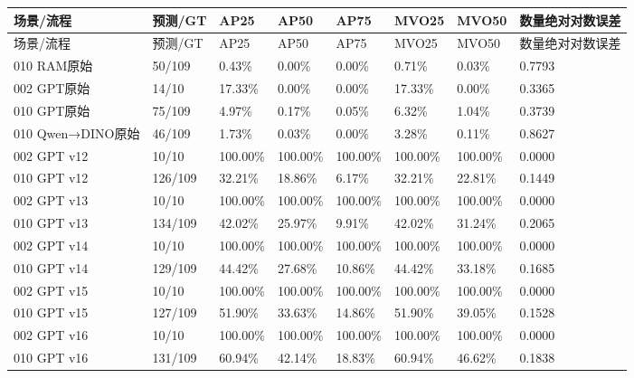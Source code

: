 \documentclass[UTF8,fontset=fandol]{ctexart}
\begin{document}
{\small
\begin{longtable}{|p{}|p{}|p{}|p{}|p{}|p{}|p{}|p{}|}
\hline
场景/流程 & 预测/GT & AP25 & AP50 & AP75 & MVO25 & MVO50 & 数量绝对对数误差 \\ \hline
\endfirsthead
\hline
场景/流程 & 预测/GT & AP25 & AP50 & AP75 & MVO25 & MVO50 & 数量绝对对数误差 \\ \hline
\endhead
010 RAM原始 & 50/109 & 0.43\% & 0.00\% & 0.00\% & 0.71\% & 0.03\% & 0.7793 \\ \hline
002 GPT原始 & 14/10 & 17.33\% & 0.00\% & 0.00\% & 17.33\% & 0.00\% & 0.3365 \\ \hline
010 GPT原始 & 75/109 & 4.97\% & 0.17\% & 0.05\% & 6.32\% & 1.04\% & 0.3739 \\ \hline
010 Qwen→DINO原始 & 46/109 & 1.73\% & 0.03\% & 0.00\% & 3.28\% & 0.11\% & 0.8627 \\ \hline
002 GPT v12 & 10/10 & 100.00\% & 100.00\% & 100.00\% & 100.00\% & 100.00\% & 0.0000 \\ \hline
010 GPT v12 & 126/109 & 32.21\% & 18.86\% & 6.17\% & 32.21\% & 22.81\% & 0.1449 \\ \hline
002 GPT v13 & 10/10 & 100.00\% & 100.00\% & 100.00\% & 100.00\% & 100.00\% & 0.0000 \\ \hline
010 GPT v13 & 134/109 & 42.02\% & 25.97\% & 9.91\% & 42.02\% & 31.24\% & 0.2065 \\ \hline
002 GPT v14 & 10/10 & 100.00\% & 100.00\% & 100.00\% & 100.00\% & 100.00\% & 0.0000 \\ \hline
010 GPT v14 & 129/109 & 44.42\% & 27.68\% & 10.86\% & 44.42\% & 33.18\% & 0.1685 \\ \hline
002 GPT v15 & 10/10 & 100.00\% & 100.00\% & 100.00\% & 100.00\% & 100.00\% & 0.0000 \\ \hline
010 GPT v15 & 127/109 & 51.90\% & 33.63\% & 14.86\% & 51.90\% & 39.05\% & 0.1528 \\ \hline
002 GPT v16 & 10/10 & 100.00\% & 100.00\% & 100.00\% & 100.00\% & 100.00\% & 0.0000 \\ \hline
010 GPT v16 & 131/109 & 60.94\% & 42.14\% & 18.83\% & 60.94\% & 46.62\% & 0.1838 \\ \hline

\end{longtable}}
\end{document}
